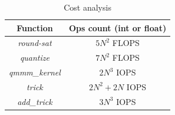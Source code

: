\begin{table}
\centering
\begin{tabular}{ c|c } 
 
 Function & Ops count (int or float) \\
 \hline 
 \emph{round-sat} & $5N^2$ FLOPS \\
\emph{quantize} & $7N^2$ FLOPS \\
\emph{qmmm\_kernel} & $2N^3$ IOPS \\
\emph{trick} & $2N^2 + 2N$ IOPS \\
\emph{add\_trick} & $3N^3$ IOPS \\
 \end{tabular}
  \caption{Cost analysis}
\label{tab:cost} 
\end{table}





